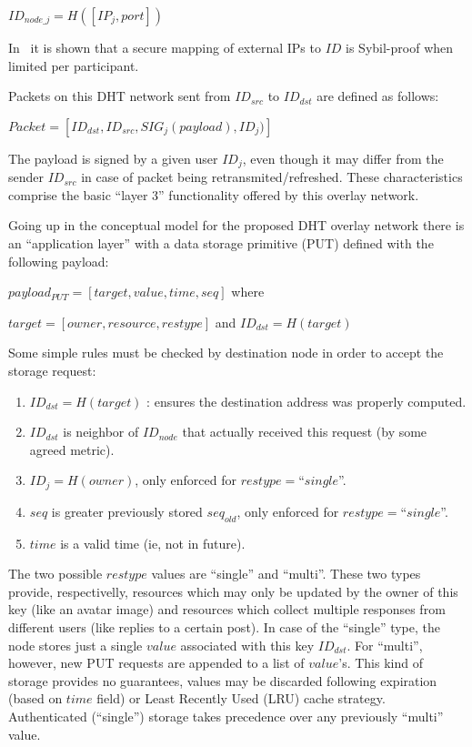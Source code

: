 \documentclass[a4paper,10pt]{article}
\begin{document}
$ID_{node\_j} = H\left( [IP_j,port] \right)$

In~\cite{dinger2006defending} it is shown that a secure mapping of external IPs to $ID$ is Sybil-proof when limited per participant.

Packets on this DHT network sent from $ID_{src}$ to $ID_{dst}$ are defined as follows:

$Packet = \left[ ID_{dst}, ID_{src}, SIG_j( payload ), ID_j) \right]$

The payload is signed by a given user $ID_j$, even though it may differ from the sender $ID_{src}$ in case of packet being retransmited/refreshed. These characteristics comprise the basic ``layer 3'' functionality offered by this overlay network.

Going up in the conceptual model for the proposed DHT overlay network there is an ``application layer'' with a data storage primitive (PUT) defined with the following payload:

$payload_{PUT} = [ target, value, time, seq ]$ where

$target = [owner, resource, restype]$ and $ID_{dst} = H(target)$

Some simple rules must be checked by destination node in order to accept the storage request:

\begin{enumerate}
    \item $ID_{dst} = H(target)$ : ensures the destination address was properly computed.
    \item $ID_{dst}$ is neighbor of $ID_{node}$ that actually received this request (by some agreed metric).
    \item $ID_j = H(owner)$, only enforced for $restype = $``$single$''.
    \item $seq$ is greater previously stored $seq_{old}$, only enforced for $restype = $``$single$''.
    \item $time$ is a valid time (ie, not in future).
\end{enumerate}

The two possible $restype$ values are ``single'' and ``multi''. These two types provide, respectivelly, resources which may only be updated by the owner of this key (like an avatar image) and resources which collect multiple responses from different users (like replies to a certain post). In case of the ``single'' type, the node stores just a single $value$ associated with this key $ID_{dst}$. For ``multi'', however, new PUT requests are appended to a list of $value$'s. This kind of storage provides no guarantees, values may be discarded following expiration (based on $time$ field) or Least Recently Used (LRU) cache strategy. Authenticated (``single'') storage takes precedence over any previously ``multi'' value.
\end{document}
